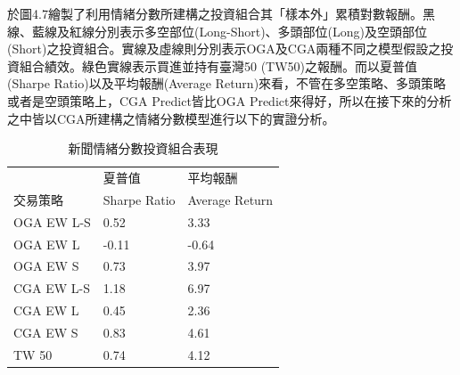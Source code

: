 於圖4.7繪製了利用情緒分數所建構之投資組合其「樣本外」累積對數報酬。黑線、藍線及紅線分別表示多空部位(Long-Short)、多頭部位(Long)及空頭部位(Short)之投資組合。實線及虛線則分別表示OGA及CGA兩種不同之模型假設之投資組合績效。綠色實線表示買進並持有臺灣50 (TW50)之報酬。而以夏普值(Sharpe Ratio)以及平均報酬(Average Return)來看，不管在多空策略、多頭策略或者是空頭策略上，CGA Predict皆比OGA Predict來得好，所以在接下來的分析之中皆以CGA所建構之情緒分數模型進行以下的實證分析。
\begin{table}[H]
\begin{center}
\begin{tabular}[c]{m{5cm}<{\centering}m{5cm}<{\centering}m{5cm}<{\centering}}
\toprule
 & 夏普值  & 平均報酬 \\
交易策略 & Sharpe Ratio & Average Return \\
\hline
OGA EW L-S & 0.52 & 3.33 \\
OGA EW L & -0.11 & -0.64 \\
OGA EW S & 0.73 & 3.97 \\
CGA EW L-S & 1.18 & 6.97 \\
CGA EW L & 0.45 & 2.36 \\
CGA EW S & 0.83 & 4.61 \\
TW 50    & 0.74 & 4.12 \\
\bottomrule
\end{tabular}
\end{center}
\caption{新聞情緒分數投資組合表現}
\label{Tab 4.6}
\end{table}

\newpage

